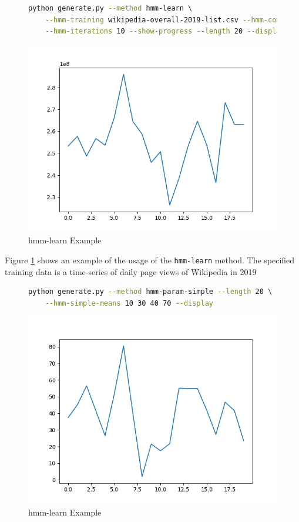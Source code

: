 \begin{figure}
\begin{lstlisting}[language=bash]
    python generate.py --method hmm-learn \
    --hmm-training wikipedia-overall-2019-list.csv --hmm-components 4 \
    --hmm-iterations 10 --show-progress --length 20 --display
\end{lstlisting}
\includegraphics[scale=0.7]{figures/hmm-learn}
\caption{hmm-learn Example}    
\label{fig:hmm-learn-example}
\end{figure}

Figure \ref{fig:hmm-learn-example} shows an example of the usage of the \texttt{hmm-learn} method. The specified training data is a time-series of daily page views of Wikipedia in 2019 \parencite{wikipedia}

\newpage

\begin{figure}
\begin{lstlisting}[language=bash]
    python generate.py --method hmm-param-simple --length 20 \
    --hmm-simple-means 10 30 40 70 --display
\end{lstlisting}
\includegraphics[scale=0.7]{figures/hmm-param-simple}
\caption{hmm-learn Example}    
\label{fig:hmm-param-simple-example}
\end{figure}

